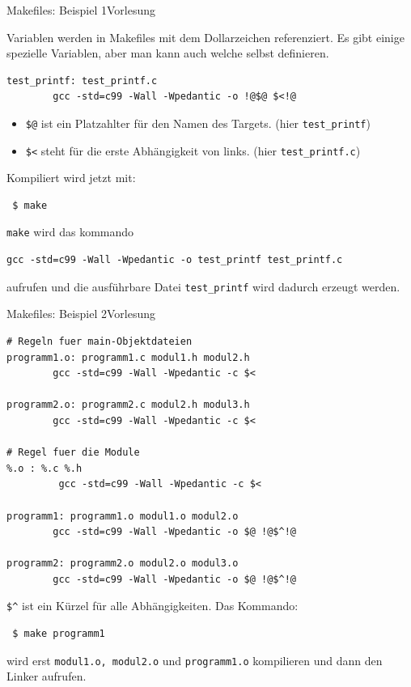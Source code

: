 \documentclass[xcolor=dvipsnames]{beamer}
\newcounter{lecturecounter}
\begin{document}
\begin{frame}[fragile]{Makefiles: Beispiel 1}{Vorlesung }
\begin{block}{}
  Variablen werden in Makefiles mit dem Dollarzeichen referenziert. Es gibt einige spezielle Variablen, aber man kann auch welche selbst definieren.
\end{block}
\begin{lstlisting}[basicstyle=\ttfamily\scriptsize]
test_printf: test_printf.c
        gcc -std=c99 -Wall -Wpedantic -o !@$@ $<!@
\end{lstlisting}
\begin{block}{}
\begin{itemize}
  \item{\verb|$@| ist ein Platzahlter für den Namen des Targets. (hier \verb|test_printf|)}
  \item{\verb|$<| steht für die erste Abhängigkeit von links. (hier \verb|test_printf.c|)}
\end{itemize}
Kompiliert wird jetzt mit:
\begin{verbatim}
 $ make
\end{verbatim}
\verb|make| wird das kommando
\begin{verbatim}
gcc -std=c99 -Wall -Wpedantic -o test_printf test_printf.c
\end{verbatim}
aufrufen und die ausführbare Datei \verb|test_printf| wird dadurch erzeugt werden.
\end{block}
\end{frame}

\begin{frame}[fragile]{Makefiles: Beispiel 2}{Vorlesung }
\begin{lstlisting}[basicstyle=\ttfamily\scriptsize]
# Regeln fuer main-Objektdateien
programm1.o: programm1.c modul1.h modul2.h
        gcc -std=c99 -Wall -Wpedantic -c $<

programm2.o: programm2.c modul2.h modul3.h
        gcc -std=c99 -Wall -Wpedantic -c $<        

# Regel fuer die Module
%.o : %.c %.h    
         gcc -std=c99 -Wall -Wpedantic -c $<

programm1: programm1.o modul1.o modul2.o
        gcc -std=c99 -Wall -Wpedantic -o $@ !@$^!@

programm2: programm2.o modul2.o modul3.o
        gcc -std=c99 -Wall -Wpedantic -o $@ !@$^!@        
\end{lstlisting}
\begin{block}{}
\verb|$^| ist ein Kürzel für alle Abhängigkeiten. Das Kommando:
\begin{verbatim}
 $ make programm1
\end{verbatim}
wird erst \verb|modul1.o, modul2.o| und \verb|programm1.o| kompilieren und dann den Linker aufrufen.
\end{block}
\end{frame}
\end{document}
